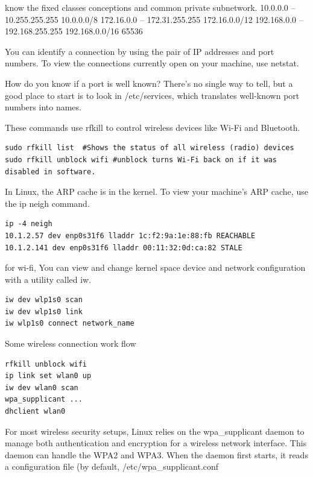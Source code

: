 \documentclass[paper=8.5in:11in, twoside, 12pt, pagesize=pdftex]{book}
\begin{document}
\par  know the fixed classes conceptions and common private subnetwork.
10.0.0.0 – 10.255.255.255 10.0.0.0/8
172.16.0.0 – 172.31.255.255 172.16.0.0/12  
192.168.0.0 – 192.168.255.255 192.168.0.0/16  65536

\par You can identify a connection by using the pair of IP addresses and port numbers. To view the connections currently open on your machine, use netstat.

\par How do you know if a port is well known? There’s no single way to tell, but a good place to start is to look in /etc/services, which translates well-known port numbers into names.


\par These commands use rfkill to control wireless devices like Wi-Fi and Bluetooth.
\begin{lstlisting}
sudo rfkill list  #Shows the status of all wireless (radio) devices
sudo rfkill unblock wifi #unblock turns Wi-Fi back on if it was disabled in software.
\end{lstlisting}

\par In Linux, the ARP cache is in the kernel. To view your machine’s ARP cache, use the ip neigh command.
\begin{lstlisting}
ip -4 neigh
10.1.2.57 dev enp0s31f6 lladdr 1c:f2:9a:1e:88:fb REACHABLE
10.1.2.141 dev enp0s31f6 lladdr 00:11:32:0d:ca:82 STALE
\end{lstlisting}

	\par for wi-fi, You can view and change kernel space device and network configuration
with a utility called iw.
\begin{lstlisting}
iw dev wlp1s0 scan
iw dev wlp1s0 link
iw wlp1s0 connect network_name
\end{lstlisting}

	\par Some wireless connection work flow
\begin{lstlisting}
rfkill unblock wifi
ip link set wlan0 up
iw dev wlan0 scan
wpa_supplicant ...
dhclient wlan0
\end{lstlisting}

	\par For most wireless security setups, Linux relies on the wpa\_supplicant daemon to manage both authentication and encryption for a wireless network interface. This daemon can handle the WPA2 and WPA3. When the daemon first starts, it reads a configuration file (by default, /etc/wpa\_supplicant.conf
\end{document}
